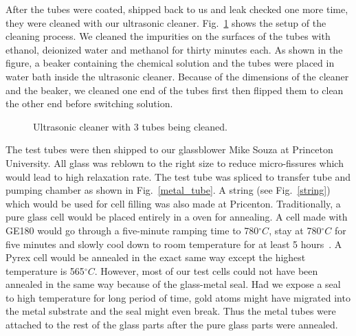 After the tubes were coated, shipped back to us and leak checked one more time, they were cleaned with our ultrasonic cleaner. Fig.~\ref{ultrasonic_cleaner} shows the setup of the cleaning process. We cleaned the impurities on the surfaces of the tubes with ethanol, deionized water and methanol for thirty minutes each. As shown in the figure, a beaker containing the chemical solution and the tubes were placed in water bath inside the ultrasonic cleaner. Because of the dimensions of the cleaner and the beaker, we cleaned one end of the tubes first then flipped them to clean the other end before switching solution.

\begin{figure}[H]
	\centering
	\caption{{Ultrasonic cleaner with 3 tubes being cleaned.}}
	\label{ultrasonic_cleaner}
\end{figure}

The test tubes were then shipped to our glassblower Mike Souza at Princeton University. All glass was reblown to the right size to reduce micro-fissures which would lead to high relaxation rate. The test tube was spliced to transfer tube and pumping chamber as shown in Fig.~\ref{metal_tube}. A string (see Fig.~\ref{string}) which would be used for cell filling was also made at Pricenton. Traditionally, a pure glass cell would be placed entirely in a oven for annealing. A cell made with GE180 would go through a five-minute ramping time to 780$^{\circ}C$, stay at 780$^{\circ}C$ for five minutes and slowly cool down to room temperature for at least 5 hours~\cite{DanThesis}. A Pyrex cell would be annealed in the exact same way except the highest temperature is 565$^{\circ}C$. However, most of our test cells could not have been annealed in the same way because of the glass-metal seal. Had we expose a seal to high temperature for long period of time, gold atoms might have migrated into the metal substrate and the seal might even break. Thus the metal tubes were attached to the rest of the glass parts after the pure glass parts were annealed. 

